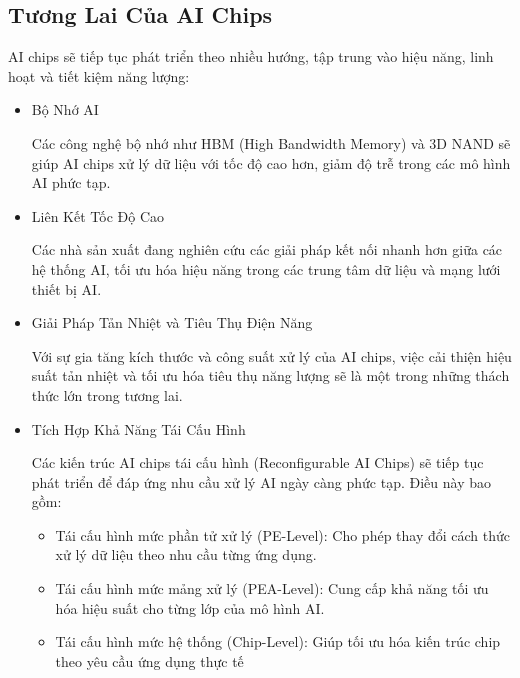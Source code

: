 \documentclass[a4paper]{article}
\begin{document}
\subsection{Tương Lai Của AI Chips}
AI chips sẽ tiếp tục phát triển theo nhiều hướng, tập trung vào hiệu năng, linh hoạt và tiết kiệm năng lượng:
\begin{itemize}
    \item Bộ Nhớ AI \par
    Các công nghệ bộ nhớ như HBM (High Bandwidth Memory) và 3D NAND sẽ giúp AI chips xử lý dữ liệu với tốc độ cao hơn, giảm độ trễ trong các mô hình AI phức tạp.
    \item Liên Kết Tốc Độ Cao \par
    Các nhà sản xuất đang nghiên cứu các giải pháp kết nối nhanh hơn giữa các hệ thống AI, tối ưu hóa hiệu năng trong các trung tâm dữ liệu và mạng lưới thiết bị AI.
    \item Giải Pháp Tản Nhiệt và Tiêu Thụ Điện Năng \par
    Với sự gia tăng kích thước và công suất xử lý của AI chips, việc cải thiện hiệu suất tản nhiệt và tối ưu hóa tiêu thụ năng lượng sẽ là một trong những thách thức lớn trong tương lai.
    \item Tích Hợp Khả Năng Tái Cấu Hình\par
    Các kiến trúc AI chips tái cấu hình (Reconfigurable AI Chips) sẽ tiếp tục phát triển để đáp ứng nhu cầu xử lý AI ngày càng phức tạp. Điều này bao gồm:
    \begin{itemize}
        \item Tái cấu hình mức phần tử xử lý (PE-Level): Cho phép thay đổi cách thức xử lý dữ liệu theo nhu cầu từng ứng dụng.
        \item Tái cấu hình mức mảng xử lý (PEA-Level): Cung cấp khả năng tối ưu hóa hiệu suất cho từng lớp của mô hình AI.
        \item Tái cấu hình mức hệ thống (Chip-Level): Giúp tối ưu hóa kiến trúc chip theo yêu cầu ứng dụng thực tế
    \end{itemize}
\end{itemize}
\end{document}
